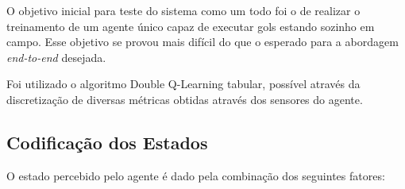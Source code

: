 
O objetivo inicial para teste do sistema como um todo foi o de realizar o treinamento de um agente único capaz de executar gols estando sozinho em campo. Esse objetivo se provou mais difícil do que o esperado para a abordagem \textit{end-to-end} desejada.

Foi utilizado o algoritmo Double Q-Learning tabular, possível através da discretização de diversas métricas obtidas através dos sensores do agente.

\subsection{Codificação dos Estados}

O estado percebido pelo agente é dado pela combinação dos seguintes fatores:

